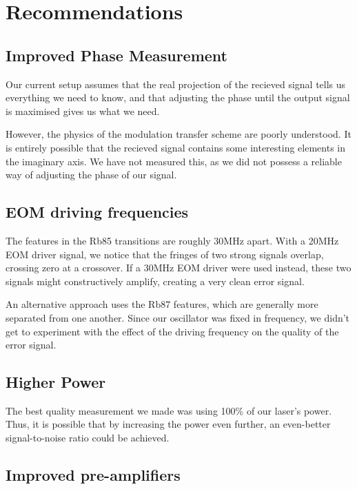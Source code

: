 \newpage

\section{Recommendations}
\label{sec:recommendations}

\subsection{Improved Phase Measurement}

Our current setup assumes that the real projection of the recieved signal tells us everything we need to know, and that adjusting the phase until the output signal is maximised gives us what we need.

However, the physics of the modulation transfer scheme are poorly understood.  It is entirely possible that the recieved signal contains some interesting elements in the imaginary axis.  We have not measured this, as we did not possess a reliable way of adjusting the phase of our signal.

\subsection{EOM driving frequencies}

The features in the Rb85 transitions are roughly 30MHz apart.  With a 20MHz EOM driver signal, we notice that the fringes of two strong signals overlap, crossing zero at a crossover.  If a 30MHz EOM driver were used instead, these two signals might constructively amplify, creating a very clean error signal.

An alternative approach uses the Rb87 features, which are generally more separated from one another.  Since our oscillator was fixed in frequency, we didn't get to experiment with the effect of the driving frequency on the quality of the error signal.

\subsection{Higher Power}

The best quality measurement we made was using 100\% of our laser's power.  Thus, it is possible that by increasing the power even further, an even-better signal-to-noise ratio could be achieved.

\subsection{Improved pre-amplifiers}

